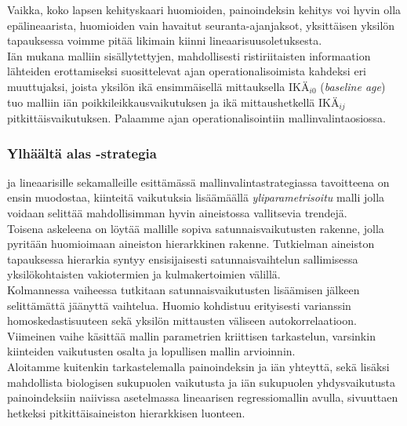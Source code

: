 \documentclass[finnish]{docopts}
\begin{document}
Vaikka, koko lapsen kehityskaari huomioiden, painoindeksin kehitys voi hyvin olla epälineaarista, huomioiden vain havaitut seuranta-ajanjaksot, yksittäisen yksilön tapauksessa voimme pitää likimain kiinni lineaarisuusoletuksesta.\\

Iän mukana malliin sisällytettyjen, mahdollisesti ristiriitaisten informaation lähteiden erottamiseksi \cite{fitzmaurice11} suosittelevat ajan operationalisoimista kahdeksi eri muuttujaksi, joista yksilön ikä ensimmäisellä mittauksella $\text{IKÄ}_{i0}$ (\textit{baseline age}) tuo malliin iän poikkileikkausvaikutuksen ja ikä mittaushetkellä $\text{IKÄ}_{ij}$ pitkittäisvaikutuksen. Palaamme ajan operationalisointiin mallinvalintaosiossa.\\

\subsubsection{Ylhäältä alas -strategia}
\label{ssb:ylhalas}

\cite{west14} ja \cite{verbeke00} lineaarisille sekamalleille esittämässä mallinvalintastrategiassa tavoitteena on ensin muodostaa, kiinteitä vaikutuksia lisäämäällä \textit{yliparametrisoitu} malli jolla voidaan selittää mahdollisimman hyvin aineistossa vallitsevia trendejä.\\

Toisena askeleena on löytää mallille sopiva satunnaisvaikutusten rakenne, jolla pyritään huomioimaan aineiston hierarkkinen rakenne. Tutkielman aineiston tapauksessa hierarkia syntyy ensisijaisesti satunnaisvaihtelun sallimisessa yksilökohtaisten vakiotermien ja kulmakertoimien välillä.\\

Kolmannessa vaiheessa tutkitaan satunnaisvaikutusten lisäämisen jälkeen selittämättä jäänyttä vaihtelua. Huomio kohdistuu erityisesti varianssin homoskedastisuuteen sekä yksilön mittausten väliseen autokorrelaatioon.\\ 
Viimeinen vaihe käsittää mallin parametrien kriittisen tarkastelun, varsinkin kiinteiden vaikutusten osalta ja lopullisen mallin arvioinnin.\\

Aloitamme kuitenkin tarkastelemalla painoindeksin ja iän yhteyttä, sekä lisäksi mahdollista biologisen sukupuolen vaikutusta ja iän sukupuolen yhdysvaikutusta painoindeksiin naiivissa asetelmassa lineaarisen regressiomallin avulla, sivuuttaen hetkeksi pitkittäisaineiston hierarkkisen luonteen.\\
\end{document}
